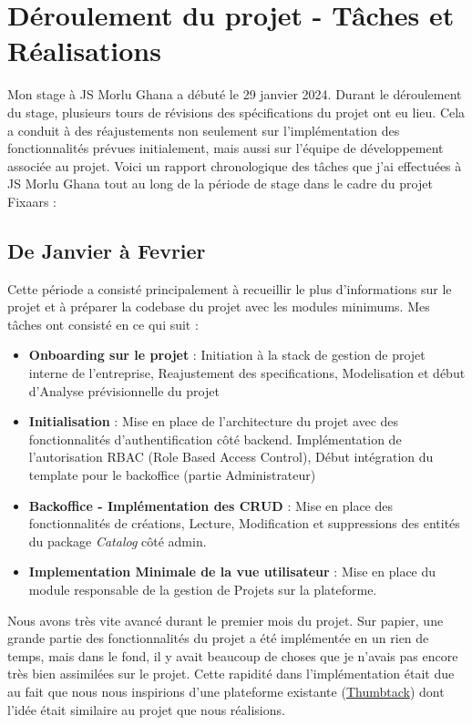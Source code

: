 {\section{Déroulement du projet - Tâches et Réalisations}

Mon stage à JS Morlu Ghana a débuté le 29 janvier 2024. Durant le déroulement du stage, plusieurs tours de révisions des spécifications du projet ont eu lieu. Cela a conduit à des réajustements non seulement sur l'implémentation des fonctionnalités prévues initialement, mais aussi sur l'équipe de développement associée au projet. Voici un rapport chronologique des tâches que j'ai effectuées à JS Morlu Ghana tout au long de la période de stage dans le cadre du projet Fixaars :

\subsection*{De Janvier à Fevrier} 

Cette période a consisté principalement à recueillir le plus d'informations sur le projet et à préparer la codebase du projet avec les modules minimums. Mes tâches ont consisté en ce qui suit :\\ 

\begin{itemize}
    \item \textbf{Onboarding sur le projet} : Initiation à la stack de gestion de projet interne de l'entreprise, Reajustement des specifications, Modelisation et début d'Analyse prévisionnelle du projet
    \item \textbf{Initialisation} : Mise en place de l'architecture du projet avec des fonctionnalités d'authentification côté backend. Implémentation de l'autorisation RBAC (Role Based Access Control), Début intégration du template pour le backoffice (partie Administrateur)
    \item \textbf{ Backoffice - Implémentation des CRUD} : Mise en place des fonctionnalités de créations, Lecture, Modification et suppressions des entités du package \textit{Catalog} côté admin.
    \item \textbf{Implementation Minimale de la vue utilisateur} : Mise en place du module responsable de la gestion de Projets sur la plateforme.
\end{itemize}

\vspace{1cm}
Nous avons très vite avancé durant le premier mois du projet. Sur papier, une grande partie des fonctionnalités du projet a été implémentée en un rien de temps, mais dans le fond, il y avait beaucoup de choses que je n'avais pas encore très bien assimilées sur le projet. Cette rapidité dans l'implémentation était due au fait que nous nous inspirions d'une plateforme existante (\href{https://www.thumbtack.com/}{Thumbtack}) dont l'idée était similaire au projet que nous réalisions.

}
